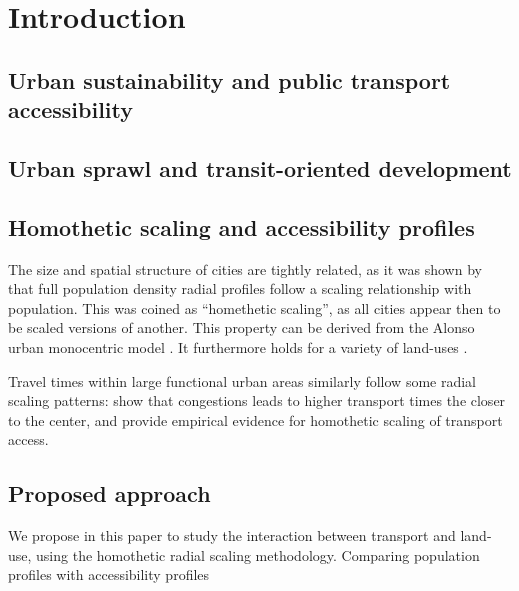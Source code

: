 \documentclass{article}
\begin{document}



\section{Introduction}

\subsection{Urban sustainability and public transport accessibility}



\subsection{Urban sprawl and transit-oriented development}



\subsection{Homothetic scaling and accessibility profiles}

The size and spatial structure of cities are tightly related, as it was shown by \cite{lemoy2020evidence} that full population density radial profiles follow a scaling relationship with population. This was coined as ``homethetic scaling'', as all cities appear then to be scaled versions of another. This property can be derived from the Alonso urban monocentric model \cite{delloye2020alonso}. It furthermore holds for a variety of land-uses \cite{lemoy2021radial}.

Travel times within large functional urban areas similarly follow some radial scaling patterns: \cite{mennicken2019internal} show that congestions leads to higher transport times the closer to the center, and provide empirical evidence for homothetic scaling of transport access.



\subsection{Proposed approach}

We propose in this paper to study the interaction between transport and land-use, using the homothetic radial scaling methodology. Comparing population profiles with accessibility profiles 
\end{document}
